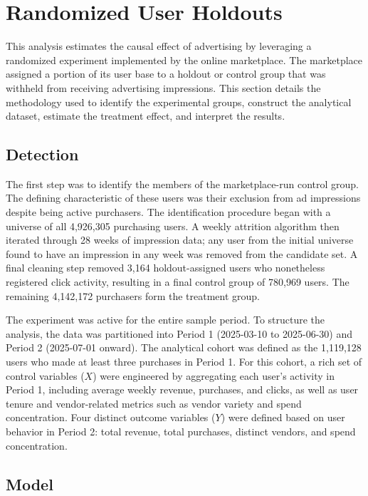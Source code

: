 \section*{Randomized User Holdouts}

This analysis estimates the causal effect of advertising by leveraging a randomized experiment implemented by the online marketplace. The marketplace assigned a portion of its user base to a holdout or control group that was withheld from receiving advertising impressions. This section details the methodology used to identify the experimental groups, construct the analytical dataset, estimate the treatment effect, and interpret the results.

\subsection*{Detection}

The first step was to identify the members of the marketplace-run control group. The defining characteristic of these users was their exclusion from ad impressions despite being active purchasers. The identification procedure began with a universe of all 4,926,305 purchasing users. A weekly attrition algorithm then iterated through 28 weeks of impression data; any user from the initial universe found to have an impression in any week was removed from the candidate set. A final cleaning step removed 3,164 holdout-assigned users who nonetheless registered click activity, resulting in a final control group of 780,969 users. The remaining 4,142,172 purchasers form the treatment group.

The experiment was active for the entire sample period. To structure the analysis, the data was partitioned into Period 1 (2025-03-10 to 2025-06-30) and Period 2 (2025-07-01 onward). The analytical cohort was defined as the 1,119,128 users who made at least three purchases in Period 1. For this cohort, a rich set of control variables ($X$) were engineered by aggregating each user's activity in Period 1, including average weekly revenue, purchases, and clicks, as well as user tenure and vendor-related metrics such as vendor variety and spend concentration. Four distinct outcome variables ($Y$) were defined based on user behavior in Period 2: total revenue, total purchases, distinct vendors, and spend concentration.

\subsection*{Model}

